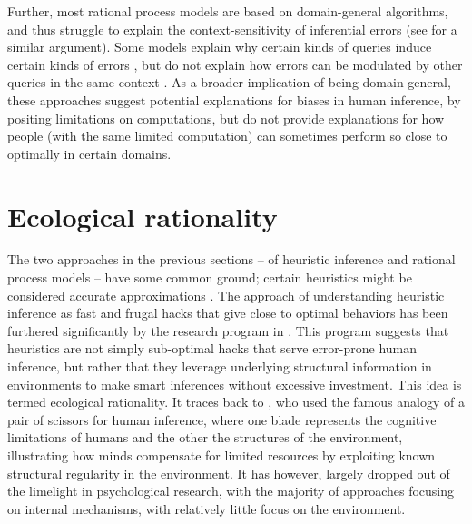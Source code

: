 Further, most rational process models are based on domain-general algorithms, and thus struggle to explain the context-sensitivity of inferential errors (see \citet{mercier2017enigma} for a similar argument). Some models explain why certain kinds of queries induce certain kinds of errors \citep{dasgupta2017hypotheses}, but do not explain how errors can be modulated by other queries in the same context \citep{gershman2014amortized,dasgupta2018remembrance}. As a broader implication of being domain-general, these approaches suggest potential explanations for biases in human inference, by positing limitations on computations, but do not provide explanations for how people (with the same limited computation) can sometimes perform so close to optimally in certain domains.

\section{Ecological rationality}

The two approaches in the previous sections -- of heuristic inference and rational process models -- have some common ground; certain heuristics might be considered accurate approximations \citep{gigerenzer2009homo, parpart2018heuristics, belousov2016catching}. The approach of understanding heuristic inference as fast and frugal hacks that give close to optimal behaviors has been furthered significantly by the research program in \citet{gigerenzer2011heuristic}. This program suggests that heuristics are not simply sub-optimal hacks that serve error-prone human inference, but rather that they leverage underlying structural information in environments to make smart inferences without excessive investment. This idea is termed ecological rationality. It traces back to \citet{simon1955behavioral}, who used the famous analogy of a pair of scissors for human inference, where one blade represents the cognitive limitations of humans and the other the structures of the environment, illustrating how minds compensate for limited resources by exploiting known structural regularity in the environment. It has however, largely dropped out of the limelight in psychological research, with the majority of approaches focusing on internal mechanisms, with relatively little focus on the environment.

